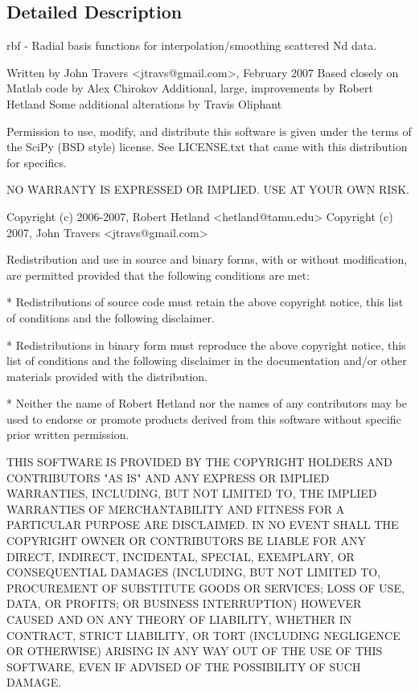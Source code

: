 \subsection{Detailed Description}
\begin{DoxyVerb}rbf - Radial basis functions for interpolation/smoothing scattered Nd data.

Written by John Travers <jtravs@gmail.com>, February 2007
Based closely on Matlab code by Alex Chirokov
Additional, large, improvements by Robert Hetland
Some additional alterations by Travis Oliphant

Permission to use, modify, and distribute this software is given under the
terms of the SciPy (BSD style) license.  See LICENSE.txt that came with
this distribution for specifics.

NO WARRANTY IS EXPRESSED OR IMPLIED.  USE AT YOUR OWN RISK.

Copyright (c) 2006-2007, Robert Hetland <hetland@tamu.edu>
Copyright (c) 2007, John Travers <jtravs@gmail.com>

Redistribution and use in source and binary forms, with or without
modification, are permitted provided that the following conditions are
met:

    * Redistributions of source code must retain the above copyright
       notice, this list of conditions and the following disclaimer.

    * Redistributions in binary form must reproduce the above
       copyright notice, this list of conditions and the following
       disclaimer in the documentation and/or other materials provided
       with the distribution.

    * Neither the name of Robert Hetland nor the names of any
       contributors may be used to endorse or promote products derived
       from this software without specific prior written permission.

THIS SOFTWARE IS PROVIDED BY THE COPYRIGHT HOLDERS AND CONTRIBUTORS
"AS IS" AND ANY EXPRESS OR IMPLIED WARRANTIES, INCLUDING, BUT NOT
LIMITED TO, THE IMPLIED WARRANTIES OF MERCHANTABILITY AND FITNESS FOR
A PARTICULAR PURPOSE ARE DISCLAIMED. IN NO EVENT SHALL THE COPYRIGHT
OWNER OR CONTRIBUTORS BE LIABLE FOR ANY DIRECT, INDIRECT, INCIDENTAL,
SPECIAL, EXEMPLARY, OR CONSEQUENTIAL DAMAGES (INCLUDING, BUT NOT
LIMITED TO, PROCUREMENT OF SUBSTITUTE GOODS OR SERVICES; LOSS OF USE,
DATA, OR PROFITS; OR BUSINESS INTERRUPTION) HOWEVER CAUSED AND ON ANY
THEORY OF LIABILITY, WHETHER IN CONTRACT, STRICT LIABILITY, OR TORT
(INCLUDING NEGLIGENCE OR OTHERWISE) ARISING IN ANY WAY OUT OF THE USE
OF THIS SOFTWARE, EVEN IF ADVISED OF THE POSSIBILITY OF SUCH DAMAGE.
\end{DoxyVerb}
 


